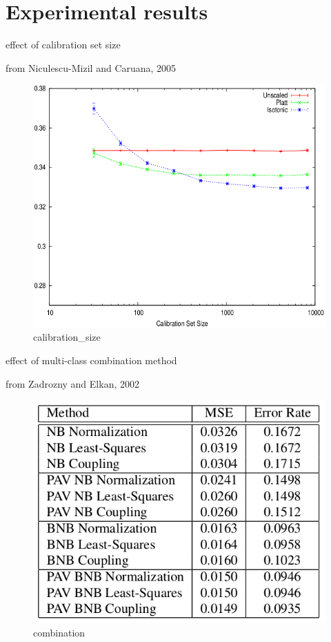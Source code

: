 \documentclass[ignorenonframetext,]{beamer}
\begin{document}
\section{Experimental results}\label{experimental-results}

\begin{frame}{effect of calibration set size}

\footnotesize
from Niculescu-Mizil and Caruana, 2005

\begin{figure}[htbp]
\centering
\includegraphics{./calibration_size.png}
\caption{calibration\_size}
\end{figure}

\end{frame}

\begin{frame}{effect of multi-class combination method}

\footnotesize
from Zadrozny and Elkan, 2002

\begin{figure}[htbp]
\centering
\includegraphics{./multiclass_combination.png}
\caption{combination}
\end{figure}

\end{frame}
\end{document}
